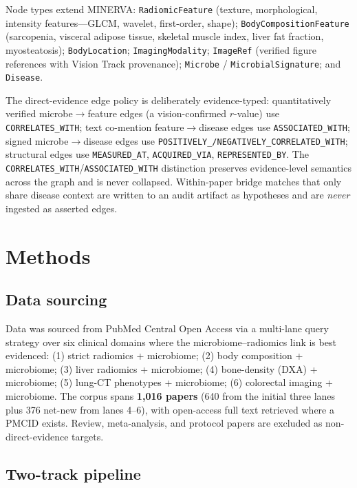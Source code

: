 \documentclass[10pt,twocolumn,letterpaper]{article}
\begin{document}
Node types extend MINERVA: \texttt{RadiomicFeature} (texture, morphological,
intensity features---GLCM, wavelet, first-order, shape);
\texttt{BodyCompositionFeature} (sarcopenia, visceral adipose tissue,
skeletal muscle index, liver fat fraction, myosteatosis); \texttt{BodyLocation};
\texttt{ImagingModality}; \texttt{ImageRef} (verified figure references with
Vision Track provenance); \texttt{Microbe} / \texttt{MicrobialSignature}; and
\texttt{Disease}.

The direct-evidence edge policy is deliberately evidence-typed:
quantitatively verified microbe$\rightarrow$feature edges (a vision-confirmed
$r$-value) use \texttt{CORRELATES\_WITH}; text co-mention
feature$\rightarrow$disease edges use \texttt{ASSOCIATED\_WITH}; signed
microbe$\rightarrow$disease edges use
\texttt{POSITIVELY\_/NEGATIVELY\_CORRELATED\_WITH}; structural edges use
\texttt{MEASURED\_AT}, \texttt{ACQUIRED\_VIA}, \texttt{REPRESENTED\_BY}. The
\texttt{CORRELATES\_WITH}/\texttt{ASSOCIATED\_WITH} distinction preserves
evidence-level semantics across the graph and is never collapsed. Within-paper
bridge matches that only share disease context are written to an audit
artifact as hypotheses and are \emph{never} ingested as asserted edges.

\section{Methods}

\subsection{Data sourcing}

Data was sourced from PubMed Central Open Access via a multi-lane query
strategy over six clinical domains where the microbiome--radiomics link is
best evidenced: (1) strict radiomics + microbiome; (2) body composition +
microbiome; (3) liver radiomics + microbiome; (4) bone-density (DXA) +
microbiome; (5) lung-CT phenotypes + microbiome; (6) colorectal imaging +
microbiome. The corpus spans \textbf{1{,}016 papers} (640 from the initial
three lanes plus 376 net-new from lanes 4--6), with open-access full text
retrieved where a PMCID exists. Review, meta-analysis, and protocol papers
are excluded as non-direct-evidence targets.

\subsection{Two-track pipeline}
\end{document}

